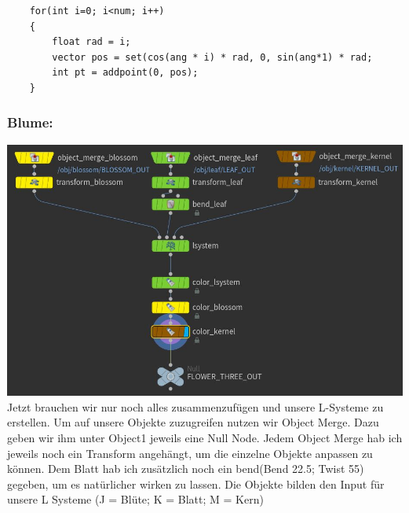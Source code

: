 \begin{​itemize}
\begin{lstlisting}
	for(int i=0; i<num; i++)
	{
		float rad = i;
		vector pos = set(cos(ang * i) * rad, 0, sin(ang*1) * rad;
		int pt = addpoint(0, pos);
	}	
\end{lstlisting} 
\subsubsection*{​Blume:}
\includegraphics*[width=\textwidth]{graphics/flower_three.JPG}
Jetzt brauchen wir nur noch alles zusammenzufügen und unsere L-Systeme zu erstellen. 
Um auf unsere Objekte zuzugreifen nutzen wir Object Merge. Dazu geben wir ihm unter Object1 jeweils eine Null Node. Jedem Object Merge hab ich jeweils noch ein Transform angehängt, um die einzelne Objekte anpassen zu können. Dem Blatt hab ich zusätzlich noch ein bend(Bend 22.5; Twist 55) gegeben, um es natürlicher wirken zu lassen.
Die Objekte bilden den Input für unsere L Systeme (J = Blüte; K = Blatt; M = Kern)

\end{​itemize}
